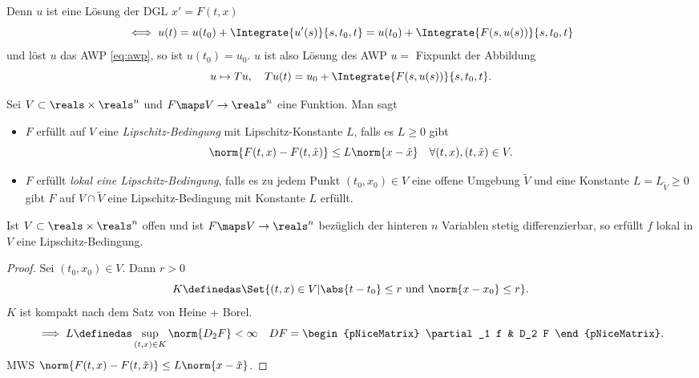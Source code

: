 Denn \( u \) ist eine Lösung der DGL \( x'=F(t,x) \)
\begin{equation*}
  \iff u(t)=u(t_0)+\Integrate{u'(s)}{s,t_0,t}=u(t_0)+\Integrate{F(s,u(s))}{s,t_0,t}
\end{equation*}
und löst \( u \) das AWP \eqref{eq:awp}, so ist \( u(t_0)=u_0 \). \( u \) ist also Lösung des AWP \tiff \( u= \) Fixpunkt der Abbildung
\begin{equation*}
  u\mapsto Tu,\quad Tu(t)=u_0+\Integrate{F(s,u(s))}{s,t_0,t}.
\end{equation*}
\begin{definition}
  Sei \( V\subset \reals\times \reals^n \) und \( F\maps V\to \reals^n  \) eine Funktion. Man sagt
  \begin{itemize}
    \item \( F \) erfüllt auf \( V \) eine \emph{Lipschitz-Bedingung} mit Lipschitz-Konstante \( L \), falls es \( L\geq 0 \) gibt \sd 
    \begin{equation*}
      \norm{F(t,x)-F(t,\tilde{x})}\leq L\norm{x-\tilde{x}}\quad \forall (t,x),(t,\tilde{x})\in V.
    \end{equation*}
    \item \( F \) erfüllt \emph{lokal eine Lipschitz-Bedingung}, falls es zu jedem Punkt \( (t_0,x_0)\in V \) eine offene Umgebung \( \tilde{V} \) und eine Konstante \( L=L_{\tilde{V}}\geq 0 \) gibt \sd \( F \) auf \( V\cap \tilde{V} \) eine Lipschitz-Bedingung mit Konstante \( L \) erfüllt. 
  \end{itemize}
\end{definition}
\begin{lemma}
  Ist \( V\subset \reals\times \reals^n \) offen und ist \( F\maps V\to \reals^n \) bezüglich der hinteren \( n \) Variablen stetig differenzierbar, so erfüllt \( f \) lokal in \( V \) eine Lipschitz-Bedingung.
\end{lemma}
\begin{proof}
  Sei \( (t_0,x_0) \in V\). Dann \texists \( r>0 \) \sd
  \begin{equation*}
    K\definedas \Set{(t,x)\in V|\abs{t-t_0}\leq r \text{ und }\norm{x-x_0}\leq r}.
  \end{equation*}
  \( K \) ist kompakt nach dem Satz von Heine + Borel.
  \begin{equation}
  \implies L\definedas \sup_{(t,x)\in K}\norm{D_2 F}<\infty\quad DF=\begin{pNiceMatrix} \partial_1 f & D_2 F \end{pNiceMatrix}.
  \end{equation}
  MWS \timplies \( \norm{F(t,x)-F(t,\tilde{x})}\leq L\norm{x-\tilde{x}} \).
  
\end{proof}
